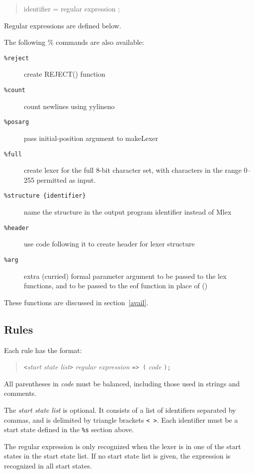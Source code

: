\begin{quote}
        {identifier} = {regular expression} ;
\end{quote}

Regular expressions are defined below.

The following \% commands are also available:

\begin{description}
\item[\tt \%reject]     create REJECT() function
\item[\tt \%count]      count newlines using yylineno
\item[\tt \%posarg]     pass initial-position argument to makeLexer
\item[\tt \%full]       create lexer for the full 8-bit character set,
                          with characters in the range 0--255 permitted
                          as input.
\item[\tt \%structure \{identifier\}]  name the structure in the output program
                          {identifier} instead of Mlex
\item[\tt \%header] 	use code following it to create header for lexer
			  structure
\item[\tt \%arg]       extra (curried) formal parameter argument to be
			  passed to the lex functions, and to be passed
			  to the eof function in place of ()
\end{description}
        These functions are discussed in section~\ref{avail}.

\subsection{Rules}

Each rule has the format:

\begin{quote}
       \verb|<|{\it start state list}\verb|>| {\it regular expression} \verb|=> (| {\it code} \verb|);|
\end{quote}

All parentheses in  {\it code}  must be balanced, including those
used in strings and comments.

The {\it start state list} is optional.  It consists of a list of
identifiers separated by commas, and is delimited by triangle
brackets \verb|< >|.  Each identifier must be a start state defined in the
\verb|%s| section above.

The regular expression is only recognized when the lexer is in one of
the start states in the start state list.  If no start state list is
given, the expression is recognized in all start states.

